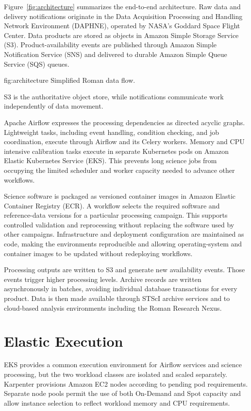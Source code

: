 \documentclass[11pt,twoside]{article}
\begin{document}
Figure~\ref{fig:architecture} summarizes the end-to-end architecture. Raw data and delivery notifications originate in the Data Acquisition Processing and Handling Network Environment (DAPHNE), operated by NASA's Goddard Space Flight Center. Data products are stored as objects in Amazon Simple Storage Service (S3). Product-availability events are published through Amazon Simple Notification Service (SNS) and delivered to durable Amazon Simple Queue Service (SQS) queues.

 {fig:architecture} {Simplified Roman data flow.}

S3 is the authoritative object store, while notifications communicate work independently of data movement.

Apache Airflow expresses the processing dependencies as directed acyclic graphs. Lightweight tasks, including event handling, condition checking, and job coordination, execute through Airflow and its Celery workers. Memory and CPU intensive calibration tasks execute in separate Kubernetes pods on Amazon Elastic Kubernetes Service (EKS). This prevents long science jobs from occupying the limited scheduler and worker capacity needed to advance other workflows.

Science software is packaged as versioned container images in Amazon Elastic Container Registry (ECR). A workflow selects the required software and reference-data versions for a particular processing campaign. This supports controlled validation and reprocessing without replacing the software used by other campaigns. Infrastructure and deployment configuration are maintained as code, making the environments reproducible and allowing operating-system and container images to be updated without redeploying workflows.

Processing outputs are written to S3 and generate new availability events. Those events trigger higher processing levels. Archive records are written asynchronously in batches, avoiding individual database transactions for every product. Data is then made available through STScI archive services and to cloud-based analysis environments including the Roman Research Nexus.

\section{Elastic Execution}

EKS provides a common execution environment for Airflow services and science processing, but the two workload classes are isolated and scaled separately. Karpenter provisions Amazon EC2 nodes according to pending pod requirements. Separate node pools permit the use of both On-Demand and Spot capacity and allow instance selection to reflect workload memory and CPU requirements.
\end{document}

